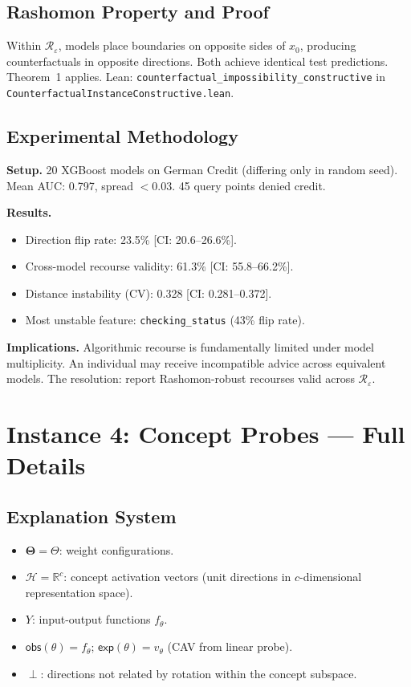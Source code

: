 \documentclass{article}
\newcommand{\R}{\mathbb{R}}
\newcommand{\Params}{\mathbf{\Theta}}
\newcommand{\sH}{\mathcal{H}}
\newcommand{\incomp}{\perp}
\begin{document}
\subsection{Rashomon Property and Proof}

Within $\mathcal{R}_\varepsilon$, models place boundaries on opposite sides of $x_0$, producing counterfactuals in opposite directions.  Both achieve identical test predictions.  Theorem~1 applies.  Lean: \texttt{counterfactual\_impossibility\_constructive} in \texttt{CounterfactualInstanceConstructive.lean}.

\subsection{Experimental Methodology}

\textbf{Setup.}  20 XGBoost models on German Credit (differing only in random seed).  Mean AUC: 0.797, spread $< 0.03$.  45 query points denied credit.

\textbf{Results.}
\begin{itemize}
  \item Direction flip rate: 23.5\% [CI: 20.6--26.6\%].
  \item Cross-model recourse validity: 61.3\% [CI: 55.8--66.2\%].
  \item Distance instability (CV): 0.328 [CI: 0.281--0.372].
  \item Most unstable feature: \texttt{checking\_status} (43\% flip rate).
\end{itemize}

\textbf{Implications.}  Algorithmic recourse is fundamentally limited under model multiplicity.  An individual may receive incompatible advice across equivalent models.  The resolution: report Rashomon-robust recourses valid across $\mathcal{R}_\varepsilon$.

\section{Instance 4: Concept Probes --- Full Details}
\label{sec:concept-full}

\subsection{Explanation System}

\begin{itemize}
  \item $\Params = \Theta$: weight configurations.
  \item $\sH = \R^c$: concept activation vectors (unit directions in $c$-dimensional representation space).
  \item $Y$: input-output functions $f_\theta$.
  \item $\mathsf{obs}(\theta) = f_\theta$; $\mathsf{exp}(\theta) = v_\theta$ (CAV from linear probe).
  \item $\incomp$: directions not related by rotation within the concept subspace.
\end{itemize}
\end{document}
